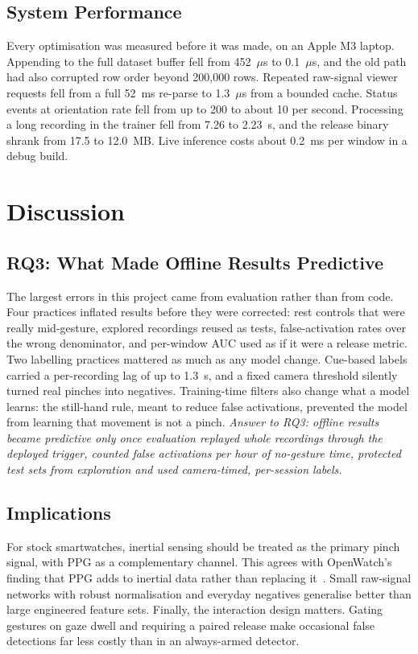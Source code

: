 \subsection{System Performance}

Every optimisation was measured before it was made, on an Apple M3 laptop. Appending to the full dataset buffer fell from 452~$\mu$s to 0.1~$\mu$s, and the old path had also corrupted row order beyond 200{,}000 rows. Repeated raw-signal viewer requests fell from a full 52~ms re-parse to 1.3~$\mu$s from a bounded cache. Status events at orientation rate fell from up to 200 to about 10 per second. Processing a long recording in the trainer fell from 7.26 to 2.23~s, and the release binary shrank from 17.5 to 12.0~MB. Live inference costs about 0.2~ms per window in a debug build.

\section{Discussion}\label{sec:discussion}

\subsection{RQ3: What Made Offline Results Predictive}

The largest errors in this project came from evaluation rather than from code. Four practices inflated results before they were corrected: rest controls that were really mid-gesture, explored recordings reused as tests, false-activation rates over the wrong denominator, and per-window AUC used as if it were a release metric. Two labelling practices mattered as much as any model change. Cue-based labels carried a per-recording lag of up to 1.3~s, and a fixed camera threshold silently turned real pinches into negatives. Training-time filters also change what a model learns: the still-hand rule, meant to reduce false activations, prevented the model from learning that movement is not a pinch. \emph{Answer to RQ3: offline results became predictive only once evaluation replayed whole recordings through the deployed trigger, counted false activations per hour of no-gesture time, protected test sets from exploration and used camera-timed, per-session labels.}

\subsection{Implications}

For stock smartwatches, inertial sensing should be treated as the primary pinch signal, with PPG as a complementary channel. This agrees with OpenWatch's finding that PPG adds to inertial data rather than replacing it~\cite{bonazzi2026openwatch}. Small raw-signal networks with robust normalisation and everyday negatives generalise better than large engineered feature sets. Finally, the interaction design matters. Gating gestures on gaze dwell and requiring a paired release make occasional false detections far less costly than in an always-armed detector.

